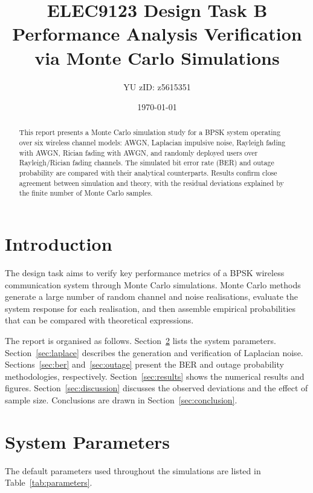 \documentclass[12pt,a4paper]{article}
\title{\textbf{ELEC9123 Design Task B}\\[0.3em]
\large Performance Analysis Verification via Monte Carlo Simulations}
\author{YU \quad zID: z5615351}
\date{\today}
\begin{document}
\maketitle

\begin{abstract}
This report presents a Monte Carlo simulation study for a BPSK system operating over six wireless channel models: AWGN, Laplacian impulsive noise, Rayleigh fading with AWGN, Rician fading with AWGN, and randomly deployed users over Rayleigh/Rician fading channels. The simulated bit error rate (BER) and outage probability are compared with their analytical counterparts. Results confirm close agreement between simulation and theory, with the residual deviations explained by the finite number of Monte Carlo samples.
\end{abstract}

\tableofcontents
\newpage

\section{Introduction}
The design task aims to verify key performance metrics of a BPSK wireless communication system through Monte Carlo simulations. Monte Carlo methods generate a large number of random channel and noise realisations, evaluate the system response for each realisation, and then assemble empirical probabilities that can be compared with theoretical expressions.

The report is organised as follows. Section~\ref{sec:parameters} lists the system parameters. Section~\ref{sec:laplace} describes the generation and verification of Laplacian noise. Sections~\ref{sec:ber} and~\ref{sec:outage} present the BER and outage probability methodologies, respectively. Section~\ref{sec:results} shows the numerical results and figures. Section~\ref{sec:discussion} discusses the observed deviations and the effect of sample size. Conclusions are drawn in Section~\ref{sec:conclusion}.

\section{System Parameters}\label{sec:parameters}
The default parameters used throughout the simulations are listed in Table~\ref{tab:parameters}.
\end{document}
